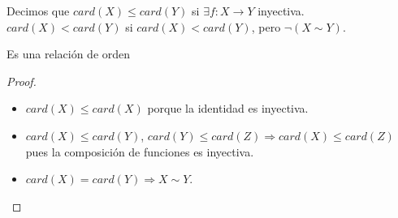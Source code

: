 \begin{definition}
	Decimos que \(card(X) \leq card(Y)\) si \(\exists f: X \to Y\) inyectiva. \\
	\(card(X) < card(Y)\) si \(card(X) < card(Y)\), pero \(\neg(X\sim Y)\).
\end{definition}

\begin{prop}
	Es una relación de orden
	\begin{proof}
		\begin{itemize}
			\item \(card(X) \leq card(X)\) porque la identidad es inyectiva.
			\item \(card(X) \leq card(Y)\), \(card(Y) \leq card(Z) \Rightarrow card(X) \leq card(Z)\) pues la composición de funciones es inyectiva.
			\item \(card(X) = card(Y) \Rightarrow X \sim Y\).
		\end{itemize}
	\end{proof}
\end{prop}

